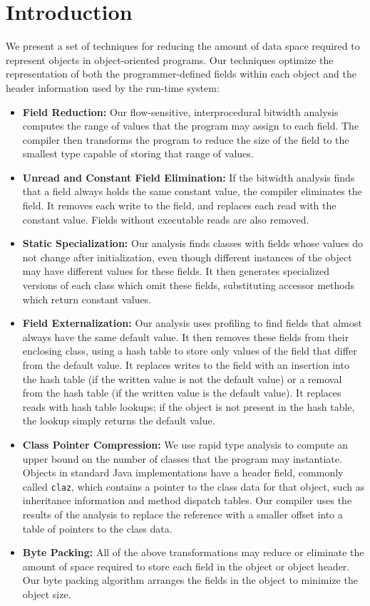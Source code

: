 \documentclass{sig-alt-full}
\begin{document}
\section{Introduction}
%
We present a set of techniques for reducing the
amount of data space required to represent objects
in object-oriented programs. Our techniques optimize
the representation of both the programmer-defined fields
within each object and the header information used by the
run-time system:
\begin{itemize}
\item {\bf Field Reduction:} 
Our flow-sensitive, interprocedural bitwidth analysis
computes the range of values that the program
may assign to each field. The compiler then transforms the program
to reduce the size of the field to the smallest type
capable of storing that range of values. 
\item {\bf Unread and Constant Field Elimination:} 
If the bitwidth analysis finds that a field always holds
the same constant value, the compiler eliminates the field. 
It removes each write to the field, and replaces each read
with the constant value.  Fields without executable reads are
also removed.
\item {\bf Static Specialization:} Our analysis finds 
classes with fields whose values do not change after initialization,
even though different instances of the object may
have different values for these fields. It then generates 
specialized versions of each class which omit these fields,
substituting accessor methods which return constant values.
\item {\bf Field Externalization:} Our analysis uses profiling
to find fields that almost always have the same default value. 
It then removes these fields from their enclosing class, 
using a hash table to store only values of the field that differ
from the default value. It replaces writes to the field with
an insertion into the hash table (if the written value is not the
default value) or a removal from the hash table (if the written value
is the default value). It replaces reads with hash table lookups; 
if the object is not present in the hash table, the lookup simply
returns the default value. 
\item {\bf Class Pointer Compression:} We use rapid type analysis
to compute an upper bound on the number of classes that the
program may instantiate. Objects in standard 
Java implementations have a header field, commonly called {\tt claz},
which contains a pointer
to the class data for that object,
such as inheritance information and method dispatch tables.
Our compiler uses the results of the 
analysis to replace the reference with a smaller
offset into a table of pointers to the class data. 
\item {\bf Byte Packing:} All of the above transformations may
reduce or eliminate the amount of space required to store each
field in the object or object header. Our byte packing algorithm
arranges the fields in the object to minimize the object size.
\end{itemize}
\end{document}
